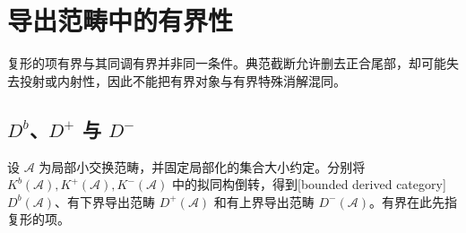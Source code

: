 
\section{导出范畴中的有界性}
\label{b4:sec:1703}

复形的项有界与其同调有界并非同一条件。典范截断允许删去正合尾部，却可能失去投射或内射性，因此不能把有界对象与有界特殊消解混同。


%
%

\subsection{\texorpdfstring{\(D^b\)、\(D^+\) 与 \(D^-\)}{Db、D+ 与 D−}}
\label{b4:subsec:1703:01}

\begin{definition}\label{b4:def:bounded-derived}
	设 \(\mathcal A\) 为局部小交换范畴，并固定局部化的集合大小约定。分别将 \(K^b(\mathcal A),K^+(\mathcal A),K^-(\mathcal A)\) 中的拟同构倒转，得到[bounded derived category] \(D^b(\mathcal A)\)、有下界导出范畴 \(D^+(\mathcal A)\) 和有上界导出范畴 \(D^-(\mathcal A)\)。有界在此先指复形的项。
\end{definition}

